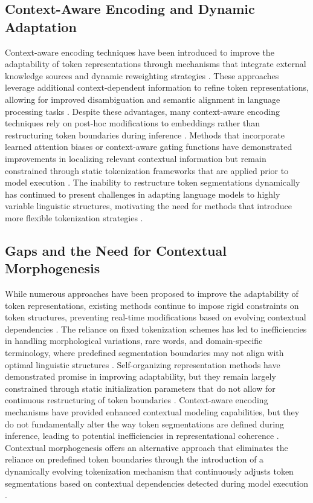 \subsection{Context-Aware Encoding and Dynamic Adaptation}

Context-aware encoding techniques have been introduced to improve the adaptability of token representations through mechanisms that integrate external knowledge sources and dynamic reweighting strategies \cite{rikitoshi2024automated, embury2024dynamic}. These approaches leverage additional context-dependent information to refine token representations, allowing for improved disambiguation and semantic alignment in language processing tasks \cite{harcourt2024automated}. Despite these advantages, many context-aware encoding techniques rely on post-hoc modifications to embeddings rather than restructuring token boundaries during inference \cite{durheum2024semantic}. Methods that incorporate learned attention biases or context-aware gating functions have demonstrated improvements in localizing relevant contextual information but remain constrained through static tokenization frameworks that are applied prior to model execution \cite{geline2024linguistic,guerrero2024hierarchical}. The inability to restructure token segmentations dynamically has continued to present challenges in adapting language models to highly variable linguistic structures, motivating the need for methods that introduce more flexible tokenization strategies \cite{gong2024large}.

\subsection{Gaps and the Need for Contextual Morphogenesis}

While numerous approaches have been proposed to improve the adaptability of token representations, existing methods continue to impose rigid constraints on token structures, preventing real-time modifications based on evolving contextual dependencies \cite{la2024neural,firstova2024investigating}. The reliance on fixed tokenization schemes has led to inefficiencies in handling morphological variations, rare words, and domain-specific terminology, where predefined segmentation boundaries may not align with optimal linguistic structures \cite{almir2024transformer}. Self-organizing representation methods have demonstrated promise in improving adaptability, but they remain largely constrained through static initialization parameters that do not allow for continuous restructuring of token boundaries \cite{merrick2024upscaling}. Context-aware encoding mechanisms have provided enhanced contextual modeling capabilities, but they do not fundamentally alter the way token segmentations are defined during inference, leading to potential inefficiencies in representational coherence \cite{kong2024dynamic, amizern2024dynamic}. Contextual morphogenesis offers an alternative approach that eliminates the reliance on predefined token boundaries through the introduction of a dynamically evolving tokenization mechanism that continuously adjusts token segmentations based on contextual dependencies detected during model execution \cite{ashcroft2024evaluation}.